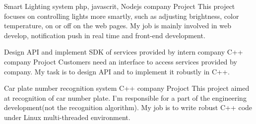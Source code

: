 \documentclass[11pt,a4paper]{moderncv}
\begin{document}
\vspace*{0.2\baselineskip}
{Smart Lighting system}
{php, javascrit, Nodejs}
{company Project}
{}
{
This project focuses on controlling lights more smartly, such as adjusting brightness, color temperature, on or off on the web pages.  My job is mainly involved in web develop, notification push in real time and front-end development.\\
}


\vspace*{0.2\baselineskip}
{Design API and implement SDK of services provided by intern company}
{C++}
{company Projoct}
{}
{
Customers need an interface to access services provided by company. My task is to design API and to implement it robustly in C++.\\
}

\vspace*{0.2\baselineskip}
{Car plate number recognition system}
{C++}
{company Projoct}
{}
{
    This project aimed at recognition of car number plate. I'm responsible for a part of the engineering development(not the recognition algorithm). My job is to write robust C++ code under Linux multi-threaded environment. \\
}
%
%
\end{document}
